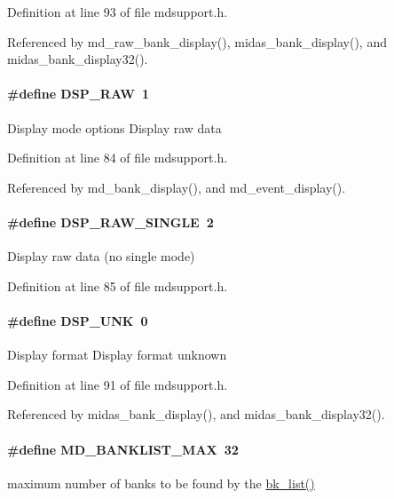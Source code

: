 Definition at line 93 of file mdsupport.h.

Referenced by md\_\-raw\_\-bank\_\-display(), midas\_\-bank\_\-display(), and midas\_\-bank\_\-display32().
\paragraph[{DSP\_\-RAW}]{\setlength{\rightskip}{0pt plus 5cm}\#define DSP\_\-RAW~1}\hfill\label{group__mdsupportdefineh_ga91f9ebc9c69f56ea2a32c98fdd3830e4}
Display mode options Display raw data 

Definition at line 84 of file mdsupport.h.

Referenced by md\_\-bank\_\-display(), and md\_\-event\_\-display().
\paragraph[{DSP\_\-RAW\_\-SINGLE}]{\setlength{\rightskip}{0pt plus 5cm}\#define DSP\_\-RAW\_\-SINGLE~2}\hfill\label{group__mdsupportdefineh_ga6ff7e1a3a24cccf987de9236010fdcac}
Display raw data (no single mode) 

Definition at line 85 of file mdsupport.h.
\paragraph[{DSP\_\-UNK}]{\setlength{\rightskip}{0pt plus 5cm}\#define DSP\_\-UNK~0}\hfill\label{group__mdsupportdefineh_ga2a9aaff923e4600138cdbef43951f7c8}
Display format Display format unknown 

Definition at line 91 of file mdsupport.h.

Referenced by midas\_\-bank\_\-display(), and midas\_\-bank\_\-display32().
\paragraph[{MD\_\-BANKLIST\_\-MAX}]{\setlength{\rightskip}{0pt plus 5cm}\#define MD\_\-BANKLIST\_\-MAX~32}\hfill\label{group__mdsupportdefineh_gabe7395f9ad806d1c5695ddce6b7f2bef}
maximum number of banks to be found by the \hyperlink{group__bkfunctionc_ga4d8a0ef23239ae478544fa96a0e98a33}{bk\_\-list()} 

